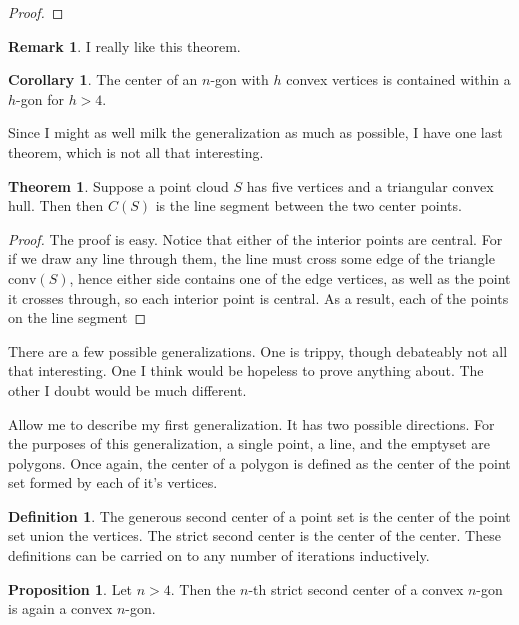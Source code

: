 \documentclass[12pt]{article}
\newcommand{\conv}[1]{\mbox{conv}(#1)}
\theoremstyle{definition}
\newtheorem*{definition}{Definition}
\newtheorem{theorem}{Theorem}
\newtheorem{corollary}{Corollary}
\newtheorem{proposition}{Proposition}
\newtheorem{remark}{Remark}
\begin{document}
\begin{proof}
\end{proof}

\begin{remark}
I really like this theorem.
\end{remark}

\begin{corollary}
The center of an $n$-gon with $h$ convex vertices is contained within a $h$-gon for $h>4$.
\end{corollary}


Since I might as well milk the generalization as much as possible, I have one last theorem, which is not all that interesting. 

\begin{theorem}

Suppose a point cloud $S$ has five vertices and a triangular convex hull. Then then $C(S)$ is the line segment between the two center points.
\end{theorem}

\begin{proof}

The proof is easy. Notice that either of the interior points are central. For if we draw any line through them, the line must cross some edge of the triangle $\conv{S}$, hence either side contains one of the edge vertices, as well as the point it crosses through, so each interior point is central. As a result, each of the points on the line segment 

\end{proof}

There are a few possible generalizations. One is trippy, though debateably not all that interesting. One I think would be hopeless to prove anything about. The other I doubt would be much different.


Allow me to describe my first generalization. It has two possible directions. For the purposes of this generalization, a single point, a line, and the emptyset are polygons. Once again, the center of a polygon is defined as the center of the point set formed by each of it's vertices.

\begin{definition}
The generous second center of a point set is the center of the point set union the vertices. The strict second center is the center of the center. These definitions can be carried on to any number of iterations inductively.
\end{definition}

\begin{proposition}
Let $n>4$. Then the $n$-th strict second center of a convex $n$-gon is again a convex $n$-gon.
\end{proposition}
\end{document}
